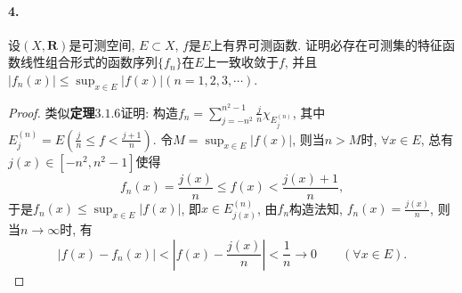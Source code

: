 \documentclass[12pt, a4paper, oneside]{ctexart}
\let\leq=\leqslant %
\def\bd{\boldsymbol}    %
\begin{document}
\paragraph{4.}设$(X,\bd{R})$是可测空间, $E\subset X$, $f$是$E$上有界可测函数. 证明必存在可测集的特征函数线性组合形式的函数序列$\{f_n\}$在$E$上一致收敛于$f$, 并且$|f_n(x)|\leq \sup_{x\in E}|f(x)|(n=1,2,3,\cdots)$.
\begin{proof}
    类似\textbf{定理}$3.1.6$证明: 构造$f_n = \sum_{j=-n^2}^{n^2-1}\frac{j}{n}\chi_{E_j^{(n)}}$, 其中$E_j^{(n)} = E\left(\frac{j}{n}\leq f < \frac{j+1}{n}\right)$. 令$M=\sup_{x\in E}|f(x)|$, 则当$n > M$时, $\forall x\in E$, 总有$j(x)\in [-n^2, n^2-1]$使得
    \begin{equation*}
        f_n(x)=\frac{j(x)}{n}\leq f(x) < \frac{j(x)+1}{n},
    \end{equation*}
    于是$f_n(x)\leq \sup_{x\in E}|f(x)|$, 即$x\in E_{j(x)}^{(n)}$, 由$f_n$构造法知, $f_n(x) = \frac{j(x)}{n}$, 则当$n\to \infty$时, 有
    \begin{equation*}
        |f(x)-f_n(x)| < \left| f(x)-\frac{j(x)}{n}\right|<\frac{1}{n}\to 0\qquad(\forall x \in E).
    \end{equation*}
\end{proof}
\end{document}

